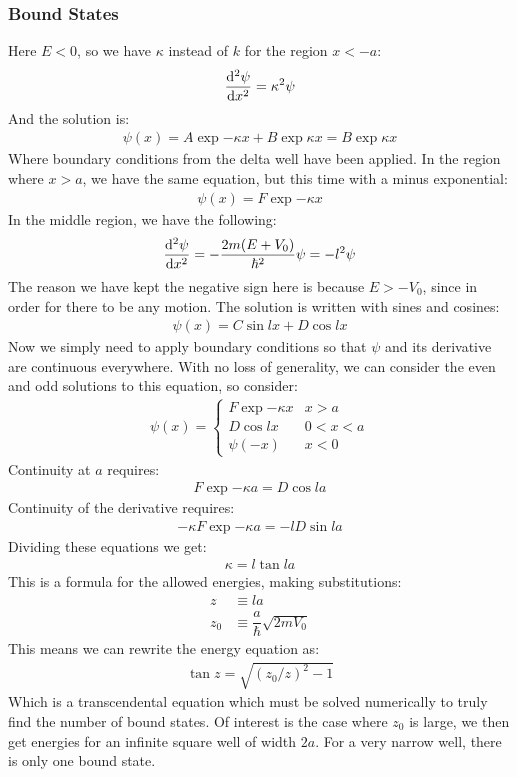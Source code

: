 \subsubsection{Bound States}
Here $E<0$, so we have $\kappa$ instead of $k$ for the region $x<-a$:
\begin{align*}
  \dv[2]{\psi}{x}=\kappa^2\psi
\end{align*}
And the solution is:
\begin{align*}
  \psi(x)=A\exp{-\kappa x}+B\exp{\kappa x}=B\exp{\kappa x}
\end{align*}
Where boundary conditions from the delta well have been applied. In the region where $x > a$, we have the same equation, but this time with a minus exponential:
\begin{align*}
  \psi(x)=F\exp{-\kappa x}
\end{align*}
In the middle region, we have the following:
\begin{align*}
  \dv[2]{\psi}{x}=-\dfrac{2m(E+V_0)}{\hbar^2}\psi=-l^2\psi
\end{align*}
The reason we have kept the negative sign here is because $E>-V_0$, since in order for there to be any motion. The solution is written with sines and cosines:
\begin{align*}
  \psi(x)=C\sin lx + D\cos lx
\end{align*}
Now we simply need to apply boundary conditions so that $\psi$ and its derivative are continuous everywhere. With no loss of generality, we can consider the even and odd solutions to this equation, so consider:
\begin{align*}
  \psi(x)=
  \begin{cases}
    F\exp{-\kappa x} & x > a \\
    D\cos lx & 0 < x < a \\
    \psi(-x) & x < 0
  \end{cases}
\end{align*}
Continuity at $a$ requires:
\begin{align*}
  F\exp{-\kappa a}=D\cos la
\end{align*}
Continuity of the derivative requires:
\begin{align*}
  -\kappa F\exp{-\kappa a}=-lD\sin la
\end{align*}
Dividing these equations we get:
\begin{align*}
  \kappa =l\tan la
\end{align*}
This is a formula for the allowed energies, making substitutions:
\begin{align*}
  z&\equiv la \\
  z_0&\equiv\dfrac{a}{\hbar}\sqrt{2mV_0}
\end{align*}
This means we can rewrite the energy equation as:
\begin{align*}
  \tan z=\sqrt{(z_0/z)^2-1}
\end{align*}
Which is a transcendental equation which must be solved numerically to truly find the number of bound states. Of interest is the case where $z_0$ is large, we then get energies for an infinite square well of width $2a$. For a very narrow well, there is only one bound state. 
